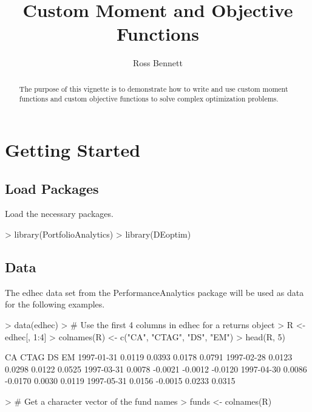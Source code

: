 \documentclass[a4paper]{article}
\begin{document}


\title{Custom Moment and Objective Functions}
\author{Ross Bennett}

\maketitle

\begin{abstract}
The purpose of this vignette is to demonstrate how to write and use custom moment functions and custom objective functions to solve complex optimization problems.
\end{abstract}

\tableofcontents

\section{Getting Started}
\subsection{Load Packages}
Load the necessary packages.

\begin{Schunk}
\begin{Sinput}
> library(PortfolioAnalytics)
> library(DEoptim)
\end{Sinput}
\end{Schunk}

\subsection{Data}
The edhec data set from the PerformanceAnalytics package will be used as data for the following examples.
\begin{Schunk}
\begin{Sinput}
> data(edhec)
> # Use the first 4 columns in edhec for a returns object
> R <- edhec[, 1:4]
> colnames(R) <- c("CA", "CTAG", "DS", "EM")
> head(R, 5)
\end{Sinput}
\begin{Soutput}
               CA    CTAG      DS      EM
1997-01-31 0.0119  0.0393  0.0178  0.0791
1997-02-28 0.0123  0.0298  0.0122  0.0525
1997-03-31 0.0078 -0.0021 -0.0012 -0.0120
1997-04-30 0.0086 -0.0170  0.0030  0.0119
1997-05-31 0.0156 -0.0015  0.0233  0.0315
\end{Soutput}
\begin{Sinput}
> # Get a character vector of the fund names
> funds <- colnames(R)
\end{Sinput}
\end{Schunk}
\end{document}
